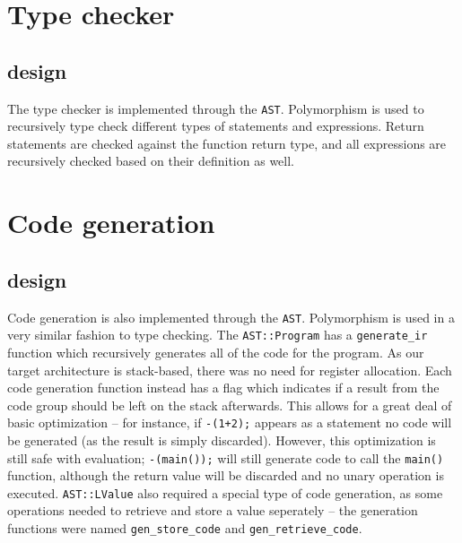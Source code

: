 \documentclass{article}
\begin{document}
\section{Type checker}
\subsection{design}
The type checker is implemented through the \texttt{AST}. Polymorphism is used to recursively type check different types of statements and expressions.
Return statements are checked against the function return type, and all expressions are recursively checked based on their definition as well.
\section{Code generation}
\subsection{design}
Code generation is also implemented through the \texttt{AST}. Polymorphism is used in a very similar fashion to type checking.
The \texttt{AST::Program} has a \texttt{generate\_ir} function which recursively generates all of the code for the program.
As our target architecture is stack-based, there was no need for register allocation. Each code generation function instead has a flag which indicates if a result from the code group should be left on the stack afterwards.
This allows for a great deal of basic optimization -- for instance, if \texttt{-(1+2);} appears as a statement no code will be generated (as the result is simply discarded).
However, this optimization is still safe with evaluation; \texttt{-(main());} will still generate code to call the \texttt{main()} function, although the return value will be discarded and no unary operation is executed.
\texttt{AST::LValue} also required a special type of code generation, as some operations needed to retrieve and store a value seperately -- the generation functions were named \texttt{gen\_store\_code} and \texttt{gen\_retrieve\_code}.
\end{document}

